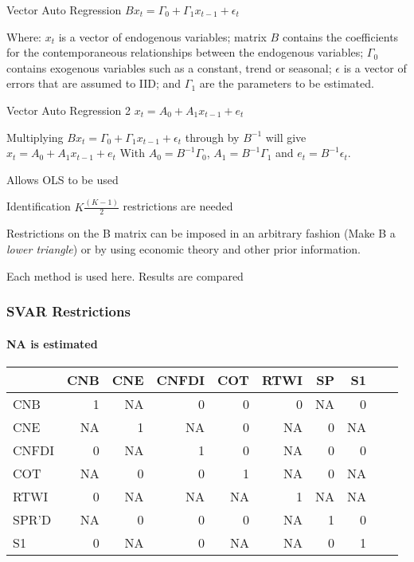 \documentclass[14pt,xcolor=pdftex,dvipsnames,table]{beamer}
\begin{document}
\begin{frame}{Vector Auto Regression}
$Bx_{t}=\Gamma_{0}+\Gamma_{1}x_{t-1}+\epsilon_{t}$
\pause

\begin{block}{}
Where: $x_t$ is a vector of endogenous variables; matrix $B$ contains the coefficients for the contemporaneous relationships between the endogenous variables; $\Gamma_0$ contains exogenous variables such as a constant, trend or seasonal; $\epsilon$ is a vector of errors that are assumed to IID; and $\Gamma_1$ are the parameters to be estimated. 
\end{block}
\pause
\end{frame}

\begin{frame}{Vector Auto Regression 2}
$x_t=A_0+A_1x_{t-1}+e_t$
\pause

\begin{block}{}
Multiplying $Bx_{t}=\Gamma_{0}+\Gamma_{1}x_{t-1}+\epsilon_{t}$
through by $B^{-1}$ will give $x_t=A_0+A_1x_{t-1}+e_t$
With $A_0=B^{-1}\Gamma_0$, $A_1=B^{-1}\Gamma_1$ and $e_t=B^{-1}\epsilon_t$. 
\end{block}
\pause
\vskip1cm
Allows OLS to be used
\end{frame}

\begin{frame}{Identification}
$K\frac{(K-1)}{2}$ restrictions are needed
\pause

\begin{block}{}
Restrictions on the B matrix can be imposed in an arbitrary fashion (Make B a \emph{lower triangle}) or by using economic theory and other prior information.  
\end{block}
\pause
\vskip1cm
Each method is used here.
\vskip1cm
Results are compared
\end{frame}

\begin{frame}
\frametitle{SVAR Restrictions}
\framesubtitle{NA is estimated}
\begin{center}
\begin{tabular}{lrrrrrrrrr}  
  \hline
 &  CNB & CNE & CNFDI & COT & RTWI & SP & S1 \\ 
  \hline
  CNB & 1 & NA & 0 & 0 & 0 & NA & 0\\ 
  CNE & NA & 1 & NA & 0 & NA & 0 & NA\\ 
  CNFDI & 0 & NA & 1 & 0 & NA & 0 & 0\\ 
  COT & NA & 0 & 0 & 1 & NA & 0 & NA \\ 
   RTWI & 0 & NA & NA & NA & 1 & NA & NA\\ 
  SPR'D & NA & 0 & 0 & 0 & NA & 1 & 0\\ 
  S1 & 0 & NA & 0 & NA & NA & 0 & 1\\ 
   \hline
\end{tabular}
\end{center}
\end{frame}
\end{document}
